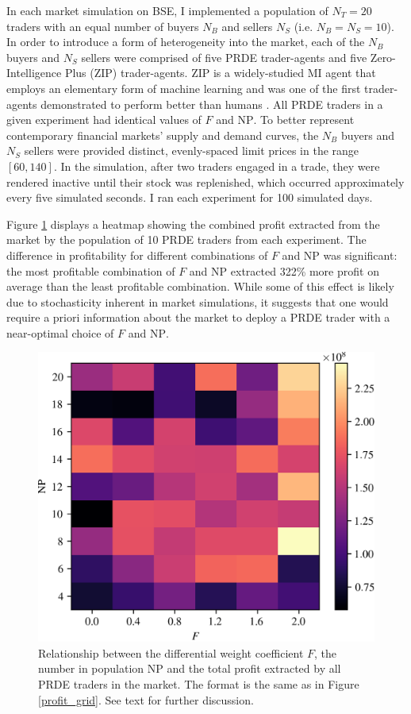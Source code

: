\documentclass[conference]{IEEEtran}
\begin{document}
In each market simulation on BSE, I implemented a population of $N_T=20$ traders with an equal number of buyers $N_B$ and sellers $N_S$ (i.e. $N_B=N_S=10$).
In order to introduce a form of heterogeneity into the market, each of the $N_B$ buyers and $N_S$ sellers were comprised of five PRDE trader-agents and five Zero-Intelligence Plus (ZIP) \cite{ZIP} trader-agents.
ZIP is a widely-studied MI agent that employs an elementary form of machine learning and was one of the first trader-agents demonstrated to perform better than humans \cite{DasHansonKephartTesauro}.
All PRDE traders in a given experiment had identical values of $F$ and $\mathrm{NP}$.
To better represent contemporary financial markets' supply and demand curves, the $N_B$ buyers and $N_S$ sellers were provided distinct, evenly-spaced limit prices in the range $[60, 140]$.
In the simulation, after two traders engaged in a trade, they were rendered inactive until their stock was replenished, which occurred approximately every five simulated seconds.
I ran each experiment for 100 simulated days.

Figure \ref{zip_profit_grid} displays a heatmap showing the combined profit extracted from the market by the population of 10 PRDE traders from each experiment.
The difference in profitability for different combinations of $F$ and $\mathrm{NP}$ was significant: the most profitable combination of $F$ and $\mathrm{NP}$ extracted 322\% more profit on average than the least profitable combination.
While some of this effect is likely due to stochasticity inherent in market simulations, it suggests that one would require a priori information about the market to deploy a PRDE trader with a near-optimal choice of $F$ and $\mathrm{NP}$.

\begin{figure}[htbp]
    \centerline{\includegraphics[width=\columnwidth]{zip_profit_grid.png}}
    \caption{
        Relationship between the differential weight coefficient $F$, the number in population $\mathrm{NP}$ and the total profit extracted by all PRDE traders in the market.
        The format is the same as in Figure \ref{profit_grid}.
        See text for further discussion.
    }
    \label{zip_profit_grid}
\end{figure}
\end{document}
